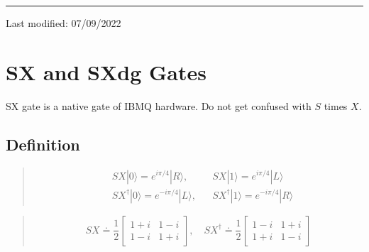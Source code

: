 \documentclass[letterpaper,10pt,english]{jupyterBook}
\begin{document}
\bigskip\hrule\bigskip


\sphinxAtStartPar
Last modified: 07/09/2022

\sphinxstepscope


\section{SX and SXdg Gates}
\label{\detokenize{q1gates/sx:sx-and-sxdg-gates}}\label{\detokenize{q1gates/sx:sec-sxgate}}\label{\detokenize{q1gates/sx::doc}}
\sphinxAtStartPar
SX gate is a native gate of IBMQ hardware. Do not get confused with \(S\) times \(X\).

\sphinxAtStartPar
{}


\subsection{Definition}
\label{\detokenize{q1gates/sx:definition}}
\sphinxAtStartPar
{}
\begin{quote}
\begin{align}
&SX |0\rangle = e^{i\pi/4}|R\rangle,  &&SX |1\rangle = e^{i\pi/4}|L\rangle\\
&SX^\dagger |0\rangle = e^{-i\pi/4}|L\rangle, &&SX^\dagger |1\rangle = e^{-i\pi/4}|R\rangle
\end{align}
\end{quote}

\sphinxAtStartPar
{}
\begin{quote}
\begin{equation}\label{equation:q1gates/sx:SXGate-matrix}
SX \doteq \frac{1}{2} \begin{bmatrix} 1+i & 1-i \\ 1-i & 1+i \end{bmatrix}, \quad
SX^\dagger \doteq \frac{1}{2} \begin{bmatrix} 1-i & 1+i \\ 1+i & 1-i \end{bmatrix}
\end{equation}
\end{quote}
\end{document}
